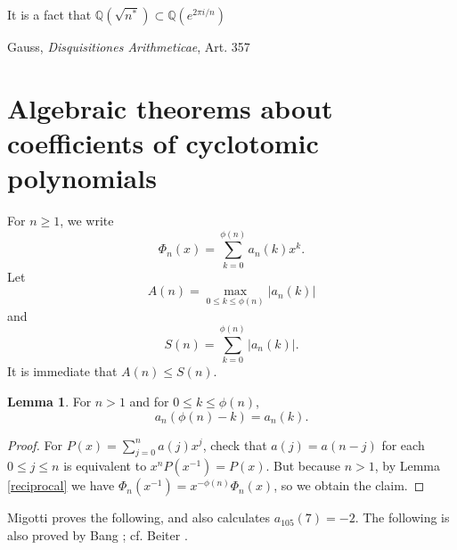 \documentclass{article}
\theoremstyle{definition}
\newtheorem{lemma}[theorem]{Lemma}
\theoremstyle{definition}
\begin{document}
It is a fact that $\mathbb{Q}( \sqrt{n^*}) \subset \mathbb{Q}(e^{2\pi i/n})$ \cite[p.~19, Proposition 5.13]{kato2}









Gauss, {\em Disquisitiones Arithmeticae}, Art. 357






\section{Algebraic theorems about coefficients of cyclotomic polynomials}
For $n \geq 1$, we write 
\[
\Phi_n(x) = \sum_{k=0}^{\phi(n)} a_n(k) x^k.
\]
Let 
\[
A(n) = \max_{0 \leq k \leq \phi(n)} |a_n(k)|
\]
and
\[
S(n) = \sum_{k=0}^{\phi(n)} |a_n(k)|.
\]
It is immediate that $A(n) \leq S(n)$. 

\begin{lemma}
For $n>1$ and for $0 \leq k \leq \phi(n)$,
\[
a_n(\phi(n)-k) = a_n(k).
\]
\label{palindrome}
\end{lemma}
\begin{proof}
For $P(x) = \sum_{j=0}^n a(j) x^j$,  check that $a(j) = a(n-j)$ for each $0 \leq j \leq n$ is equivalent to
$x^n P(x^{-1}) = P(x)$.  But because $n>1$, by Lemma \ref{reciprocal} we have $\Phi_n(x^{-1})=x^{-\phi(n)} \Phi_n(x)$,
so we obtain the claim.
\end{proof}

Migotti \cite{migotti} proves the following, and also calculates $a_{105}(7)=-2$.
The following is also proved by Bang \cite{bang}; cf. Beiter \cite{beiter1964}.
\end{document}
